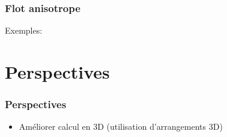 \documentclass{beamer}
\begin{document}
\begin{frame}
    \frametitle{Flot anisotrope}

    Exemples:
\end{frame}

\section{Perspectives}

\begin{frame}
    \frametitle{Perspectives}

    \begin{itemize}
        \item Améliorer calcul en 3D (utilisation d'arrangements 3D)
    \end{itemize}
\end{frame}

\end{document}
